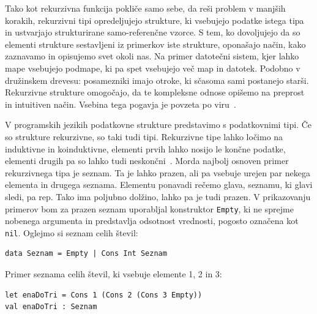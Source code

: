\documentclass[a4paper,12pt,openright]{book}
\begin{document}
Tako kot rekurzivna funkcija pokliče samo sebe, da reši problem v manjših korakih, rekurzivni tipi opredeljujejo strukture, ki vsebujejo podatke istega tipa in ustvarjajo strukturirane 
samo-referenčne vzorce. S tem, ko dovoljujejo da so elementi strukture sestavljeni iz primerkov iste strukture, oponašajo način, kako zaznavamo in opisujemo svet okoli nas. 
Na primer datotečni sistem, kjer lahko mape vsebujejo podmape, ki pa spet vsebujejo več map in datotek. Podobno v družinskem drevesu: posamezniki imajo otroke, ki sčasoma sami 
postanejo starši. Rekurzivne strukture omogočajo, da te kompleksne odnose opišemo na preprost in intuitiven način. Vsebina tega pogavja je povzeta po viru~\cite{Pie02}.

V programskih jezikih podatkovne strukture predstavimo s podatkovnimi tipi. Če so strukture rekurzivne, so taki tudi tipi. Rekurzivne tipe lahko ločimo na induktivne in koinduktivne, elementi prvih lahko nosijo le končne podatke, elementi drugih pa so lahko tudi neskončni~\cite{Sla15}. Morda najbolj osnoven primer rekurzivnega tipa je seznam. Ta je lahko prazen, ali pa vsebuje urejen par nekega elementa in drugega seznama. Elementu ponavadi rečemo glava, seznamu, 
ki glavi sledi, pa rep. Tako ima poljubno dolžino, lahko pa je tudi prazen. V prikazovanju primerov bom za prazen seznam uporabljal konstruktor \lstinline{Empty}, ki ne sprejme nobenega argumenta in predstavlja odsotnost vrednosti, pogosto označena kot \lstinline{nil}. 
Oglejmo si seznam celih števil:
\begin{lstlisting}
data Seznam = Empty | Cons Int Seznam
\end{lstlisting}
Primer seznama celih števil, ki vsebuje elemente 1, 2 in 3:
\begin{lstlisting}
let enaDoTri = Cons 1 (Cons 2 (Cons 3 Empty))
val enaDoTri : Seznam
\end{lstlisting}
\end{document}
